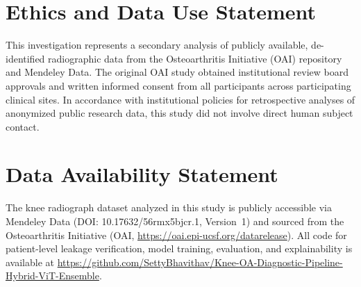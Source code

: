 \documentclass[10pt,journal]{IEEEtran}
\begin{document}
\section*{Ethics and Data Use Statement}
This investigation represents a secondary analysis of publicly available, de-identified radiographic data from the Osteoarthritis Initiative (OAI) repository and Mendeley Data. The original OAI study obtained institutional review board approvals and written informed consent from all participants across participating clinical sites. In accordance with institutional policies for retrospective analyses of anonymized public research data, this study did not involve direct human subject contact.


\section*{Data Availability Statement}
The knee radiograph dataset analyzed in this study is publicly accessible via Mendeley Data (DOI: 10.17632/56rmx5bjcr.1, Version~1) \cite{chen2018dataset} and sourced from the Osteoarthritis Initiative (OAI, \url{https://oai.epi-ucsf.org/datarelease}). All code for patient-level leakage verification, model training, evaluation, and explainability is available at \url{https://github.com/SettyBhavithav/Knee-OA-Diagnostic-Pipeline-Hybrid-ViT-Ensemble}.
\end{document}
